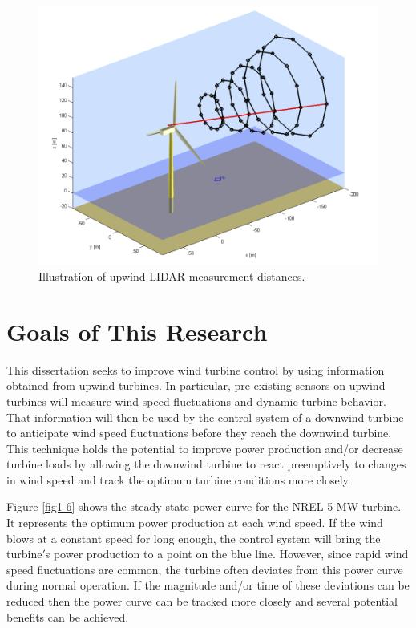 \begin{figure}[ht]
	\centering
		\includegraphics[width=.6\linewidth]{Figures/ch1Figures/fig1-5.png}
	\caption{Illustration of upwind LIDAR measurement distances.\cite{schlipf2011}}
	\label{fig1-5}
\end{figure}


\section{Goals of This Research} 

This dissertation seeks to improve wind turbine control by using information obtained from upwind turbines.  In particular, pre-existing sensors on upwind turbines will measure wind speed fluctuations and dynamic turbine behavior.  That information will then be used by the control system of a downwind turbine to anticipate wind speed fluctuations before they reach the downwind turbine.  This technique holds the potential to improve power production and/or decrease turbine loads by allowing the downwind turbine to react preemptively to changes in wind speed and track the optimum turbine conditions more closely.

Figure \ref{fig1-6} shows the steady state power curve for the NREL 5-MW turbine.  It represents the optimum power production at each wind speed.  If the wind blows at a constant speed for long enough, the control system will bring the turbine$'$s power production to a point on the blue line.  However, since rapid wind speed fluctuations are common, the turbine often deviates from this power curve during normal operation.  If the magnitude and/or time of these deviations can be reduced then the power curve can be tracked more closely and several potential benefits can be achieved.


